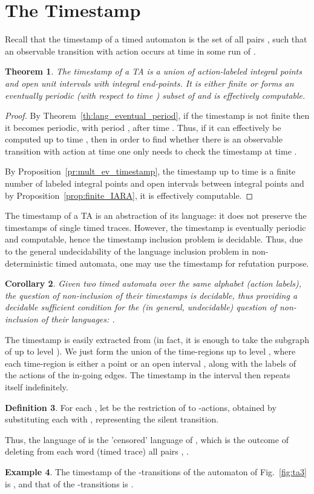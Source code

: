 \documentclass[11pt]{amsart}
\newtheorem{theorem}{Theorem}[section]
\newtheorem{corollary}[theorem]{Corollary}
\theoremstyle{definition}
\newtheorem{definition}[theorem]{Definition}
\newtheorem{example}[theorem]{Example}
\begin{document}
\section{The Timestamp}
\label{sec:timestamp}
Recall that the timestamp  of a timed automaton  is the set of all pairs , such that an observable transition with action  occurs at time  in some run of .
\begin{theorem}
\label{th:timestamp_eventual_period}
The timestamp of a TA  is a union of action-labeled integral points and open unit intervals with integral end-points.
It is either finite or forms an eventually periodic (with respect to time ) subset of  and is effectively computable.
\end{theorem}
\begin{proof}
	By Theorem~\ref{th:lang_eventual_period}, if the timestamp is not finite then it becomes periodic, with period , after time .
	Thus, if it can effectively be computed up to time , then in order to find whether there is an observable transition with action  at time  one only needs to check the timestamp at time .
	
	By Proposition~\ref{pr:mult_ev_timestamp}, the timestamp up to time  is a finite number of labeled integral points and open intervals between integral points and by Proposition~\ref{prop:finite_IARA}, it is effectively computable.	
\end{proof}


The timestamp of a TA is an abstraction of its language: it does not preserve the timestamps of single timed traces.
However, the timestamp is eventually periodic and computable, hence the timestamp inclusion problem is decidable.
Thus, due to the general undecidability of the language inclusion problem in non-deterministic timed automata, one may use the timestamp for refutation purpose.
\begin{corollary}
Given two timed automata  over the same alphabet (action labels), the question of non-inclusion of their timestamps is decidable, 
thus providing a decidable sufficient condition for the (in general, undecidable) question of non-inclusion of their languages: .
\end{corollary}

The timestamp is easily extracted from  (in fact, it is enough to take the subgraph of  up to level ).
We just form the union of the time-regions up to level , where each time-region is either a point  or an open interval , along with the labels of the actions of the in-going edges.
The timestamp in the interval  then repeats itself indefinitely. 
\begin{definition}
	For each , let  be the restriction of  to -actions, obtained by substituting each  with , representing the silent transition.
\end{definition}
Thus, the language of  is the 'censored' language of , which is the outcome of deleting from each word (timed trace) all pairs , .
\begin{example}
	The timestamp of the -transitions of the automaton of Fig.~\ref{fig:ta3} is , and that of the -transitions is .
\end{example}
\end{document}
